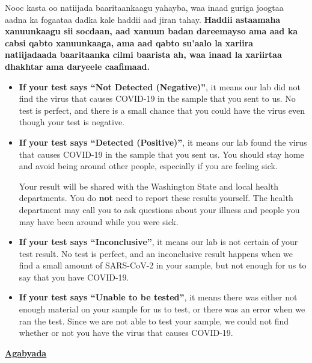 \documentclass[10pt]{article}
\begin{document}
Nooc kasta oo natiijada baaritaankaagu yahayba, waa inaad guriga joogtaa aadna
ka fogaataa dadka kale haddii aad jiran tahay. \textbf{Haddii astaamaha
xanuunkaagu sii socdaan, aad xanuun badan dareemayso ama aad ka cabsi qabto
xanuunkaaga, ama aad qabto su'aalo la xariira natiijadaada baaritaanka cilmi
baarista ah, waa inaad la xariirtaa dhakhtar ama daryeele caafimaad.}

\begin{itemize}


\item

  \textbf{If your test says ``Not Detected (Negative)''}, it means our lab did not find the
  virus that causes COVID-19 in the sample that you sent to us. No test is
  perfect, and there is a small chance that you could have the virus even though
  your test is negative.

\item

  \textbf{If your test says ``Detected (Positive)''}, it means our
  lab found the virus that causes COVID-19 in the sample that you sent us. You
  should stay home and avoid being around other people, especially if you are
  feeling sick.

  Your result will be shared with the Washington State and local health
  departments. You do \textbf{not} need to report these results yourself. The
  health department may call you to ask questions about your illness and people
  you may have been around while you were sick.

\item

  \textbf{If your test says ``Inconclusive''}, it means our lab is not certain
  of your test result. No test is perfect, and an inconclusive result happens
  when we find a small amount of SARS-CoV-2 in your sample, but not enough for
  us to say that you have COVID-19.

\item

  \textbf{If your test says ``Unable to be tested''}, it means there was either
  not enough material on your sample for us to test, or there was an error when
  we ran the test. Since we are not able to test your sample, we could not find
  whether or not you have the virus that causes COVID-19.

\end{itemize}

\bigskip

\large \underline{\textbf{Agabyada}}
\end{document}
